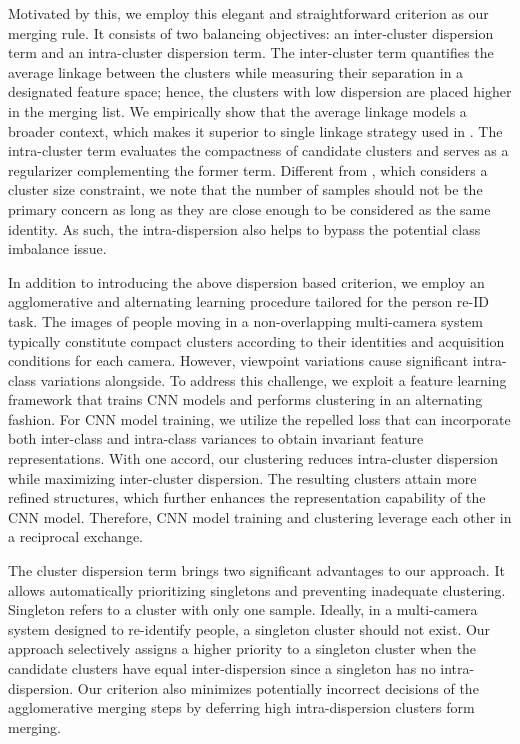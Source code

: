 \documentclass[journal]{IEEEtran}
\begin{document}
Motivated by this, we employ this elegant and straightforward criterion as our merging rule. It consists of two balancing objectives: an inter-cluster dispersion term and an intra-cluster dispersion term. The inter-cluster term quantifies the average linkage between the clusters while measuring their separation in a designated feature space; hence, the clusters with low dispersion are placed higher in the merging list. We empirically show that the average linkage models a broader context, which makes it superior to single linkage strategy used in \cite{lin2019bottom}. The intra-cluster term evaluates the compactness of candidate clusters and serves as a regularizer complementing the former term. Different from \cite{lin2019bottom}, which considers a cluster size constraint, we note that the number of samples should not be the primary concern as long as they are close enough to be considered as the same identity. As such, the intra-dispersion also helps to bypass the potential class imbalance issue.

In addition to introducing the above dispersion based criterion, we employ an agglomerative and alternating learning procedure tailored for the person re-ID task. The images of people moving in a non-overlapping multi-camera system typically constitute compact clusters according to their identities and acquisition conditions for each camera. However, viewpoint variations cause significant intra-class variations alongside. To address this challenge, we exploit a feature learning framework that trains CNN models and performs clustering in an alternating fashion. For CNN model training, we utilize the repelled loss that can incorporate both inter-class and intra-class variances to obtain invariant feature representations. With one accord, our clustering reduces intra-cluster dispersion while maximizing inter-cluster dispersion. The resulting clusters attain more refined structures, which further enhances the representation capability of the CNN model. Therefore, CNN model training and clustering leverage each other in a reciprocal exchange. 

The cluster dispersion term brings two significant advantages to our approach. It allows automatically prioritizing singletons and preventing inadequate clustering. Singleton refers to a cluster with only one sample. Ideally, in a multi-camera system designed to re-identify people, a singleton cluster should not exist. Our approach selectively assigns a higher priority to a singleton cluster when the candidate clusters have equal inter-dispersion since a singleton has no intra-dispersion. Our criterion also minimizes potentially incorrect decisions of the agglomerative merging steps by deferring high intra-dispersion clusters form merging.
\end{document}
